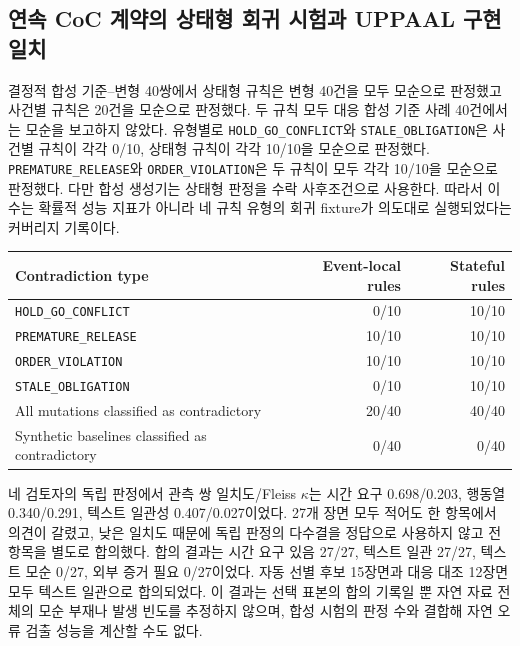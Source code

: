 \subsection{연속 CoC 계약의 상태형 회귀 시험과 UPPAAL 구현 일치}
\label{sec:results-sequential}

결정적 합성 기준--변형 40쌍에서 상태형 규칙은 변형 40건을 모두 모순으로 판정했고 사건별 규칙은 20건을 모순으로 판정했다. 두 규칙 모두 대응 합성 기준 사례 40건에서는 모순을 보고하지 않았다. 유형별로 \texttt{HOLD\_GO\_CONFLICT}와 \texttt{STALE\_OBLIGATION}은 사건별 규칙이 각각 0/10, 상태형 규칙이 각각 10/10을 모순으로 판정했다. \texttt{PREMATURE\_RELEASE}와 \texttt{ORDER\_VIOLATION}은 두 규칙이 모두 각각 10/10을 모순으로 판정했다. 다만 합성 생성기는 상태형 판정을 수락 사후조건으로 사용한다. 따라서 이 수는 확률적 성능 지표가 아니라 네 규칙 유형의 회귀 fixture가 의도대로 실행되었다는 커버리지 기록이다.

\begin{table}[t]
\centering
{}
\label{tab:sequential-mutation-results}
\scriptsize
\begin{tabularx}{\columnwidth}{L{0.42\columnwidth}rr}
\toprule
Contradiction type & Event-local rules & Stateful rules \\
\midrule
\texttt{HOLD\_GO\_CONFLICT} & 0/10 & 10/10 \\
\texttt{PREMATURE\_RELEASE} & 10/10 & 10/10 \\
\texttt{ORDER\_VIOLATION} & 10/10 & 10/10 \\
\texttt{STALE\_OBLIGATION} & 0/10 & 10/10 \\
\midrule
All mutations classified as contradictory & 20/40 & 40/40 \\
Synthetic baselines classified as contradictory & 0/40 & 0/40 \\
\bottomrule
\end{tabularx}
\end{table}

네 검토자의 독립 판정에서 관측 쌍 일치도/Fleiss $\kappa$는 시간 요구 0.698/0.203, 행동열 0.340/0.291, 텍스트 일관성 0.407/0.027이었다. 27개 장면 모두 적어도 한 항목에서 의견이 갈렸고, 낮은 일치도 때문에 독립 판정의 다수결을 정답으로 사용하지 않고 전 항목을 별도로 합의했다. 합의 결과는 시간 요구 있음 27/27, 텍스트 일관 27/27, 텍스트 모순 0/27, 외부 증거 필요 {\unknown} 0/27이었다. 자동 선별 후보 15장면과 대응 대조 12장면 모두 텍스트 일관으로 합의되었다. 이 결과는 선택 표본의 합의 기록일 뿐 자연 자료 전체의 모순 부재나 발생 빈도를 추정하지 않으며, 합성 시험의 판정 수와 결합해 자연 오류 검출 성능을 계산할 수도 없다.

